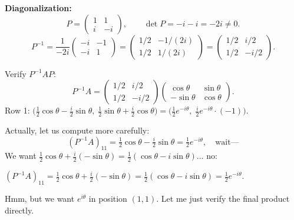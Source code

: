 \documentclass[12pt]{article}
\begin{document}
\medskip
\textbf{Diagonalization:}
\[
P = \begin{pmatrix} 1 & 1 \\ i & -i \end{pmatrix}, \qquad \det P = -i - i = -2i \neq 0.
\]
\[
P^{-1} = \frac{1}{-2i}\begin{pmatrix} -i & -1 \\ -i & 1 \end{pmatrix} = \begin{pmatrix} 1/2 & -1/(2i) \\ 1/2 & 1/(2i) \end{pmatrix} = \begin{pmatrix} 1/2 & i/2 \\ 1/2 & -i/2 \end{pmatrix}.
\]

Verify $P^{-1}AP$:
\[
P^{-1}A = \begin{pmatrix} 1/2 & i/2 \\ 1/2 & -i/2 \end{pmatrix}\begin{pmatrix} \cos\theta & \sin\theta \\ -\sin\theta & \cos\theta \end{pmatrix}.
\]
Row 1: $\bigl(\tfrac{1}{2}\cos\theta - \tfrac{i}{2}\sin\theta,\; \tfrac{1}{2}\sin\theta + \tfrac{i}{2}\cos\theta\bigr) = \bigl(\tfrac{1}{2}e^{-i\theta},\; \tfrac{i}{2}e^{-i\theta} \cdot(-1)\bigr)$.

Actually, let us compute more carefully:
\[
(P^{-1}A)_{11} = \tfrac{1}{2}\cos\theta - \tfrac{i}{2}\sin\theta = \tfrac{1}{2}e^{-i\theta}, \quad \text{wait---}
\]
We want $\tfrac{1}{2}\cos\theta + \tfrac{i}{2}(-\sin\theta) = \tfrac{1}{2}(\cos\theta - i\sin\theta)$... no:

$(P^{-1}A)_{11} = \tfrac{1}{2}\cos\theta + \tfrac{i}{2}(-\sin\theta) = \tfrac{1}{2}(\cos\theta - i\sin\theta) = \tfrac{1}{2}e^{-i\theta}$.

Hmm, but we want $e^{i\theta}$ in position $(1,1)$. Let me just verify the final product directly.
\end{document}
